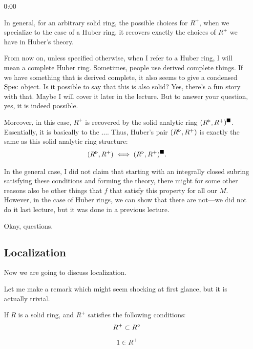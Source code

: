 \begin{unfinished}{0:00}
\begin{example}
\end{example}

In general, for an arbitrary solid ring, the possible choices for $R^+$, when we specialize to the case of a Huber ring, it recovers exactly the choices of $R^+$ we have in Huber's theory. 

From now on, unless specified otherwise, when I refer to a Huber ring, I will mean a complete Huber ring.
\ques Sometimes, people use derived complete things. If we have something that is derived complete, it also seems to give a condensed $\operatorname{Spec}$ object. Is it possible to say that this is also solid? 
\ans Yes, there's a fun story with that. Maybe I will cover it later in the lecture. But to answer your question, yes, it is indeed possible.

Moreover, in this case, $R^+$ is recovered by the solid analytic ring $(R^\triangleright, R^+)^\blacksquare$. Essentially, it is basically to the .... 
Thus, Huber's pair $(R^\triangleright, R^+)$ is exactly the same as this solid analytic ring structure:
\begin{align*}
(R^\triangleright, R^+) \iff (R^\triangleright, R^+)^\blacksquare.
\end{align*}

In the general case, I did not claim that starting with an integrally closed subring satisfying these conditions and forming the theory, there might for some other reasons also be other things that $f$ that satisfy this property for all our $M$.
However, in the case of Huber rings, we can show that there are not---we did not do it last lecture, but it was done in a previous lecture. 

Okay, questions. 

\subsection{Localization}

Now we are going to discuss localization. 

% 
\begin{remark}
Let me make a remark which might seem shocking at first glance, but it is actually trivial. 

If $R$ is a solid ring, and $R^+$ satisfies the following conditions:
\begin{align*}
R^+ \subset R^\circ
\end{align*}
\begin{align*}
1 \in R^+
\end{align*}


\end{remark}
\end{unfinished}
